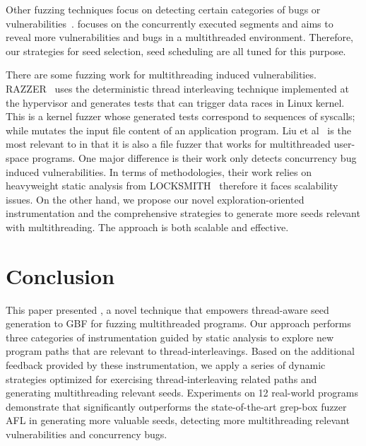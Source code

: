 Other fuzzing techniques focus on detecting certain categories of bugs or vulnerabilities~\cite{Bohme:2017:DGF,hawkeye,perffuzz,slowfuzz,junjie:2017sp:skyfire,superion,smart_gbf}.  \mtfuzz focuses on the concurrently executed segments and aims to reveal more vulnerabilities and bugs in a multithreaded environment. Therefore, our strategies for seed selection, seed scheduling are all tuned for this purpose.

There are some fuzzing work for multithreading induced vulnerabilities. RAZZER~\cite{razzer} uses the deterministic thread interleaving technique implemented at the hypervisor and generates tests that can trigger data races in Linux kernel. This is a kernel fuzzer whose generated tests correspond to sequences of syscalls; while \mtfuzz mutates the input file content of an application program. Liu et al~\cite{LiuZLZ018} is the most relevant to \mtfuzz in that it is also a file fuzzer that works for multithreaded user-space programs. One major difference is their work only detects concurrency bug induced vulnerabilities. In terms of methodologies, their work relies on heavyweight static analysis from LOCKSMITH~\cite{pratikakis2006locksmith} therefore it faces scalability issues. On the other hand, we propose our novel exploration-oriented instrumentation and the comprehensive strategies to generate more seeds relevant with multithreading. The approach is both scalable and effective.






\section{Conclusion}
This paper presented \mtfuzz, a novel technique that empowers thread-aware seed generation to GBF
for fuzzing multithreaded programs. Our approach performs three categories of instrumentation guided by static analysis to explore new program paths that are relevant to thread-interleavings. Based on the additional feedback provided by these instrumentation, we apply a series of dynamic strategies optimized for exercising thread-interleaving related paths and generating multithreading relevant seeds. 
Experiments on 12 real-world programs demonstrate that \mtfuzz significantly outperforms the state-of-the-art grep-box fuzzer AFL in generating more valuable seeds, detecting more multithreading relevant vulnerabilities and concurrency bugs.

